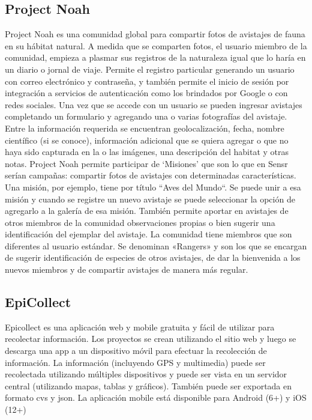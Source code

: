 \subsection{Project Noah}
Project Noah \cite{projectNoah} es una comunidad global para compartir fotos de avistajes de fauna en su hábitat natural. A medida que se comparten fotos, el usuario miembro de la comunidad, empieza a plasmar sus registros de la naturaleza igual que lo haría en un diario o jornal de viaje. 
Permite el registro particular generando un usuario con correo electrónico y contraseña, y también permite el inicio de sesión por integración a servicios de autenticación como los brindados por Google o con redes sociales.
Una vez que se accede con un usuario se pueden ingresar avistajes completando un formulario y agregando una o varias fotografías del avistaje. Entre la información requerida se encuentran geolocalización, fecha, nombre científico (si se conoce), información adicional que se quiera agregar o que no haya sido capturada en la o las imágenes, una descripción del habitat y otras notas. 
Project Noah permite participar de ‘Misiones’ que son lo que en Sensr serían campañas: compartir fotos de avistajes con determinadas características. Una misión, por ejemplo, tiene por título ``Aves del Mundo“. Se puede unir a esa misión y cuando se registre un nuevo avistaje se puede seleccionar la opción de agregarlo a la galería de esa misión. También permite aportar en avistajes de otros miembros de la comunidad observaciones propias o bien sugerir una identificación del ejemplar del avistaje.
La comunidad tiene miembros que son diferentes al usuario estándar. Se denominan «Rangers» y son los que se encargan de sugerir identificación de especies de otros avistajes, de dar la bienvenida a los nuevos miembros y de compartir avistajes de manera más regular. 

\subsection{EpiCollect}
Epicollect \cite{epicollect} es una aplicación web y mobile gratuita y fácil de utilizar para recolectar información. Los proyectos se crean utilizando el sitio web y luego se descarga una app a un dispositivo móvil para efectuar la recolección de información. 
La información (incluyendo GPS y multimedia) puede ser recolectada utilizando múltiples dispositivos y puede ser vista en un servidor central (utilizando mapas, tablas y gráficos).
También puede ser exportada en formato cvs y json.
La aplicación mobile está disponible para Android (6+) y iOS (12+)

